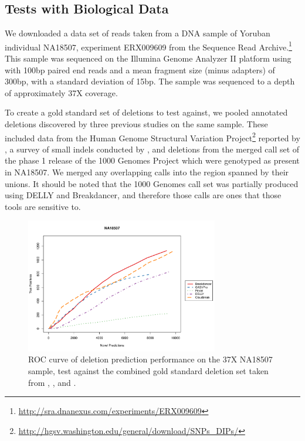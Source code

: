 \documentclass[11pt]{article}
\begin{document}
\subsection{Tests with Biological Data}

We downloaded a data set of reads taken from a DNA sample of Yoruban individual NA18507, experiment ERX009609 from the Sequence Read Archive.\footnote{\url{http://sra.dnanexus.com/experiments/ERX009609}} This sample was sequenced on the Illumina Genome Analyzer II platform using with 100bp paired end reads and a mean fragment size (minus adapters) of 300bp, with a standard deviation of 15bp. The sample was sequenced to a depth of approximately 37X coverage.

To create a gold standard set of deletions to test against, we pooled annotated deletions discovered by three previous studies on the same sample. These included data from the Human Genome Structural Variation Project\footnote{\url{http://hgsv.washington.edu/general/download/SNPs_DIPs/}} reported by \textcite{Kidd:2008p926}, a survey of small indels conducted by \textcite{Mills:2011fi}, and deletions from the merged call set of the phase 1 release of the 1000 Genomes Project \autocite{GenomesProjectConsortium:2012co} which were genotyped as present in NA18507. We merged any overlapping calls into the region spanned by their unions. It should be noted that the 1000 Genomes call set was partially produced using DELLY and Breakdancer, and therefore those calls are ones that those tools are sensitive to.

\begin{figure}[t]
\centering
\includegraphics[width=0.75\textwidth]{NA18507_ROC.pdf}
\caption{ROC curve of deletion prediction performance on the 37X NA18507 sample, test against the combined gold standard deletion set taken from \textcite{Kidd:2008p926}, \textcite{Mills:2011fi}, and \textcite{GenomesProjectConsortium:2012co}.}
\label{NA18507roc}
\end{figure}
\end{document}
